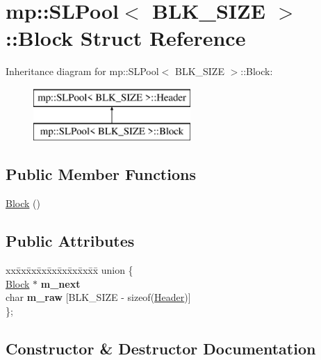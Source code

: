 \hypertarget{structmp_1_1_s_l_pool_1_1_block}{}\section{mp\+:\+:S\+L\+Pool$<$ B\+L\+K\+\_\+\+S\+I\+ZE $>$\+:\+:Block Struct Reference}
\label{structmp_1_1_s_l_pool_1_1_block}
Inheritance diagram for mp\+:\+:S\+L\+Pool$<$ B\+L\+K\+\_\+\+S\+I\+ZE $>$\+:\+:Block\+:\begin{figure}[H]
\begin{center}
\leavevmode
\includegraphics[height=2.000000cm]{structmp_1_1_s_l_pool_1_1_block}
\end{center}
\end{figure}
\subsection*{Public Member Functions}
\begin{DoxyCompactItemize}
\item 
\hyperlink{structmp_1_1_s_l_pool_1_1_block_a05fd1764262649601dd90385c8701779}{Block} ()
\end{DoxyCompactItemize}
\subsection*{Public Attributes}
\begin{DoxyCompactItemize}
\item 
\begin{tabbing}
xx\=xx\=xx\=xx\=xx\=xx\=xx\=xx\=xx\=\kill
union \{\\
\hyperlink{structmp_1_1_s_l_pool_1_1_block}{Block} $\ast$ {\bfseries m\_next}\\
char {\bfseries m\_raw} \mbox{[}BLK\_SIZE -\/ sizeof(\hyperlink{structmp_1_1_s_l_pool_1_1_header}{Header})\mbox{]}\\
\}; \\

\end{tabbing}\end{DoxyCompactItemize}


\subsection{Constructor \& Destructor Documentation}
\mbox{\label{structmp_1_1_s_l_pool_1_1_block_a05fd1764262649601dd90385c8701779}} 
